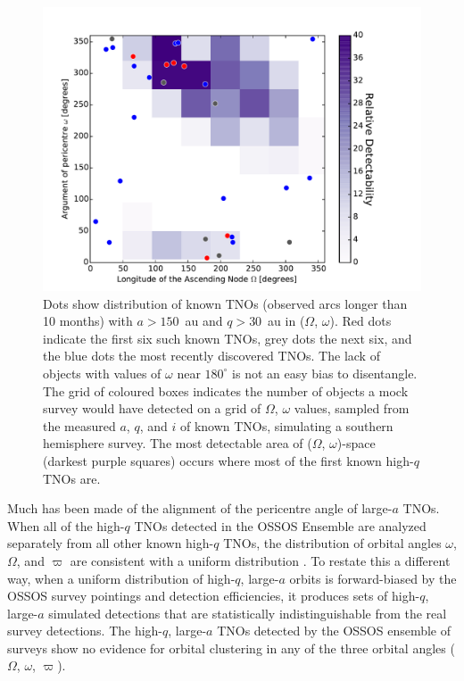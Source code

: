 \documentclass[preprint]{aastex62}
\begin{document}
\begin{figure}[htbp]
\centering
\includegraphics[width=\textwidth]{figures/figure2.pdf}
\caption{Dots show distribution of known TNOs (observed arcs longer than 10 months) with $a > 150$~au and $q > 30$~au in ($\Omega$, $\omega$).  Red dots indicate the first six such known TNOs, grey dots the next six, and the blue dots the most recently discovered TNOs.  The lack of objects with values of $\omega$ near $180^{\circ}$ is not an easy bias to disentangle.  The grid of coloured boxes indicates the number of objects a mock survey would have detected on a grid of $\Omega$, $\omega$ values, sampled from the measured $a$, $q$, and $i$ of known TNOs, simulating a southern hemisphere survey.
The most detectable area of ($\Omega$, $\omega$)-space (darkest purple squares) occurs where most of the first known high-$q$ TNOs are. }
\label{fig:bias_jj}
\end{figure}

Much has been made of the alignment of the pericentre angle of large-$a$ TNOs.  
When all of the high-$q$ TNOs detected in the OSSOS Ensemble are analyzed separately from all other known high-$q$ TNOs, the distribution of orbital angles $\omega$, $\Omega$, and $\varpi$ are consistent with a uniform distribution \citep{shankman17bias,bannister18}.
To restate this a different way, when a uniform distribution of high-$q$, large-$a$ orbits is forward-biased by the OSSOS survey pointings and detection efficiencies, it produces sets of high-$q$, large-$a$ simulated detections that are statistically indistinguishable from the real survey detections.
The high-$q$, large-$a$ TNOs detected by the OSSOS ensemble of surveys show no evidence for orbital clustering in any of the three orbital angles ($\Omega$, $\omega$, $\varpi$).
\end{document}
